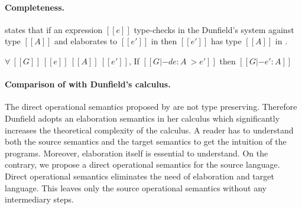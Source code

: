 \paragraph{Completeness.}  states that
if an expression $[[e]]$ type-checks in the Dunfield's system against
type $[[A]]$ and elaborates to $[[e']]$ in \namems
then $[[e']]$ has type $[[A]]$ in \namems.

\begin{lemma}
  $\forall \ [[G]] \ [[e]] \ [[A]] \ [[e']]$, If $[[G |-d e : A ~> e']]$ then $[[G |- e' : A]]$
\label{lemma:merge:dunfield:sound}
\end{lemma}

\paragraph{Comparison of \namems with Dunfield's calculus.}
The direct operational semantics proposed by
\cite{dunfield2014elaborating} are not type preserving.
Therefore Dunfield adopts an elaboration semantics in her calculus
which significantly increases the theoretical complexity
of the calculus.
A reader has to understand both the source semantics and
the target semantics to get the intuition of the programs.
Moreover, elaboration itself is essential to understand.
On the contrary, we propose a direct operational semantics
for the source language.
Direct operational semantics eliminates the need of
elaboration and target language.
This leaves only the source operational semantics
without any intermediary steps.







